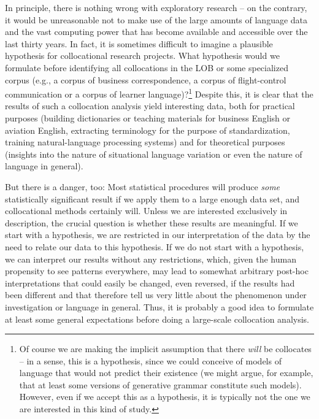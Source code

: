 In principle, there is nothing wrong with exploratory  research -- on the contrary, it would be unreasonable not to make use of the large amounts of language data and the vast computing power that has become available and accessible over the last thirty years. In fact, it is sometimes difficult to imagine a plausible hypothesis for collocational  research projects. What hypothesis would we formulate before identifying all collocations in the LOB  or some specialized corpus (e.g., a corpus of business correspondence, a corpus of flight\hyp{}control communication or a corpus of learner language)?\footnote{Of course we are making the implicit assumption that there \textit{will} be collocates -- in a sense, this is a hypothesis, since we could conceive of models of language that would not predict their existence (we might argue, for example, that at least some versions of generative  grammar constitute such models). However, even if we accept this as a hypothesis, it is typically not the one we are interested in this kind of study.} Despite this, it is clear that the results of such a collocation  analysis yield interesting data, both for practical purposes (building dictionaries  or teaching materials for business English or aviation English, extracting terminology for the purpose of standardization, training natural\hyp{}language processing systems) and for theoretical purposes (insights into the nature of situational language variation  or even the nature of language in general).

But there is a danger, too: Most statistical procedures will produce \textit{some} statistically significant  result if we apply them to a large  enough data set, and collocational  methods certainly will. Unless we are interested exclusively in description,  the crucial question is whether these results are meaningful. If we start with a hypothesis, we are restricted in our interpretation of the data by the need to relate our data to this hypothesis. If we do not start with a hypothesis, we can interpret our results without any restrictions, which, given the human propensity to see patterns everywhere, may lead to somewhat arbitrary post\hyp{}hoc interpretations that could easily be changed, even reversed, if the results had been different and that therefore tell us very little about the phenomenon under investigation or language in general. Thus, it is probably a good idea to formulate at least some general expectations before doing a large\hyp{}scale collocation  analysis.


